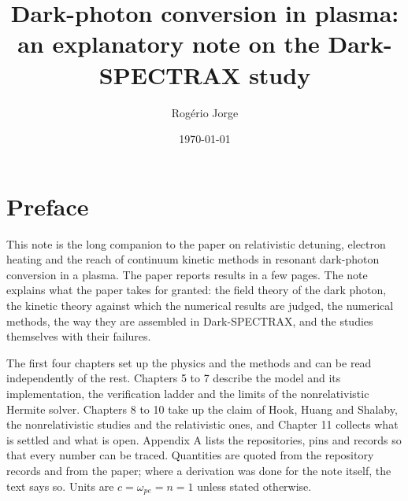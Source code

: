 \documentclass[11pt,a4paper]{report}
\title{Dark-photon conversion in plasma:\\ an explanatory note on the Dark-SPECTRAX study}
\author{Rog\'erio Jorge}
\date{\today}
\DeclareRobustCommand{\_}{\leavevmode\kern.06em\vbox{\hrule width.3em}\penalty\exhyphenpenalty\hskip0pt\relax}
\begin{document}
\maketitle
\chapter*{Preface}
This note is the long companion to the paper on relativistic detuning, electron heating and the reach of continuum kinetic methods in resonant dark-photon conversion in a plasma. The paper reports results in a few pages. The note explains what the paper takes for granted: the field theory of the dark photon, the kinetic theory against which the numerical results are judged, the numerical methods, the way they are assembled in Dark-SPECTRAX, and the studies themselves with their failures.

The first four chapters set up the physics and the methods and can be read independently of the rest. Chapters 5 to 7 describe the model and its implementation, the verification ladder and the limits of the nonrelativistic Hermite solver. Chapters 8 to 10 take up the claim of Hook, Huang and Shalaby, the nonrelativistic studies and the relativistic ones, and Chapter 11 collects what is settled and what is open. Appendix A lists the repositories, pins and records so that every number can be traced. Quantities are quoted from the repository records and from the paper; where a derivation was done for the note itself, the text says so. Units are $c=\omega_{pe}=n=1$ unless stated otherwise.
\tableofcontents
\clearpage











\appendix



\end{document}
